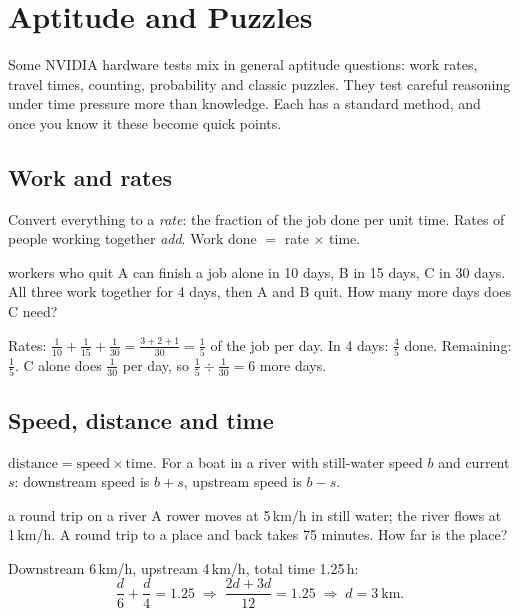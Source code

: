\chapter{Aptitude and Puzzles}
\label{ch:aptitude}

Some NVIDIA hardware tests mix in general aptitude questions: work rates, travel times, counting, probability and classic puzzles. They test careful reasoning under time pressure more than knowledge. Each has a standard method, and once you know it these become quick points.

\section{Work and rates}

\begin{bigidea}
Convert everything to a \emph{rate}: the fraction of the job done per unit time. Rates of people working together \emph{add}. Work done $=$ rate $\times$ time.
\end{bigidea}

\begin{worked}{workers who quit}
A can finish a job alone in 10 days, B in 15 days, C in 30 days. All three work together for 4 days, then A and B quit. How many more days does C need?

Rates: $\tfrac1{10} + \tfrac1{15} + \tfrac1{30} = \tfrac{3 + 2 + 1}{30} = \tfrac15$ of the job per day. In 4 days: $\tfrac45$ done. Remaining: $\tfrac15$. C alone does $\tfrac1{30}$ per day, so $\tfrac15 \div \tfrac1{30} = 6$ more days.
\end{worked}

\section{Speed, distance and time}

$\text{distance} = \text{speed} \times \text{time}$. For a boat in a river with still-water speed $b$ and current $s$: downstream speed is $b + s$, upstream speed is $b - s$.

\begin{worked}{a round trip on a river}
A rower moves at 5\,km/h in still water; the river flows at 1\,km/h. A round trip to a place and back takes 75 minutes. How far is the place?

Downstream 6\,km/h, upstream 4\,km/h, total time 1.25\,h:
\[
  \frac{d}{6} + \frac{d}{4} = 1.25 \;\Rightarrow\; \frac{2d + 3d}{12} = 1.25 \;\Rightarrow\; d = 3~\text{km}.
\]
\end{worked}

